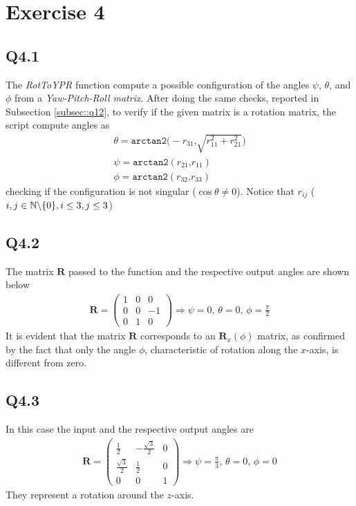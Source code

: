 \section{Exercise 4} \label{P4}

\subsection{Q4.1}
The \textit{RotToYPR} function compute a possible configuration of the angles $\psi$, $\theta$, and $\phi$ from a \textit{Yaw-Pitch-Roll matrix}. After doing the same checks, reported in Subsection \ref{subsec::q12}, to verify if the given matrix is a rotation matrix, the script compute angles as
\begin{gather*}
	\theta = \texttt{arctan2} \big (-r_{31} \texttt{,} \sqrt{r_{11}^2+r_{21}^2}\big ) \\
	\psi = \texttt{arctan2} (r_{21} \texttt{,} r_{11}) \\
	\phi = \texttt{arctan2} (r_{32} \texttt{,} r_{33})
\end{gather*}
checking if the configuration is not singular ($\cos \theta \neq 0$). Notice that $r_{ij}$ ($i,j \in \mathbb{N}\small\backslash\{0\}, i \leq 3, j \leq 3$)
\subsection{Q4.2}
The matrix $\mathbf{R}$ passed to the function and the respective output angles are shown below
\begin{gather*}
	\mathbf{R}= \begin{pmatrix}
		1& 0 & 0 \\
		0 & 0 & -1 \\
		0 & 1 & 0
	\end{pmatrix} \Rightarrow
	\psi = 0,\, 
	\theta = 0,\,\phi = \frac{\pi}{2} 
\end{gather*}
It is evident that the matrix $\mathbf{R}$ corresponds to an $\mathbf{R}_x(\phi)$ matrix, as confirmed by the fact that only the angle $\phi$, characteristic of rotation along the $x$-axis, is different from zero.
\subsection{Q4.3}
In this case the input and the respective output angles are
\begin{gather*}
	\mathbf{R}= \begin{pmatrix}
		\frac{1}{2}& -\frac{\sqrt{3}}{2} & 0 \\
		\frac{\sqrt{3}}{2} & \frac{1}{2} & 0 \\
		0 & 0 & 1
	\end{pmatrix} \Rightarrow
	\psi = \frac{\pi}{3},\,
	\theta = 0,\,
	\phi = 0
\end{gather*}
They represent a rotation around the $z$-axis.
